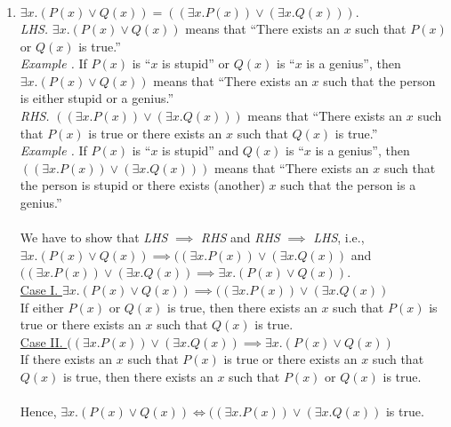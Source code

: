 \documentclass[11pt]{article}
\begin{document}
\begin{enumerate}
	\item $\exists x. (P(x) \lor Q(x)) = ((\exists x.P(x)) \lor (\exists x.Q(x))).$
	      \\
	      \emph{LHS. } $\exists x. (P(x) \lor Q(x))$ means that ``There exists an $x$ such that $P(x)$ or $Q(x)$ is true.'' \\ \emph{Example .} If $P(x)$ is ``$x$ is stupid'' or $Q(x)$ is ``$x$ is a genius'', then $\exists x. (P(x) \lor Q(x))$ means that ``There exists an $x$ such that the person is either stupid or a genius.''\bigskip
	      \\
	      \noindent \emph{RHS. } $((\exists x. P(x)) \lor (\exists x. Q(x)))$ means that ``There exists an $x$ such that $P(x)$ is true or there exists an $x$ such that $Q(x)$ is true.''\\ \emph{Example .} If $P(x)$ is ``$x$ is stupid'' and $Q(x)$ is ``$x$ is a genius'', then $((\exists x. P(x)) \lor (\exists x. Q(x)))$ means that ``There exists an $x$ such that the person is stupid or there exists (another) $x$ such that the person is a genius.''\\
	      \\
	      We have to show that \emph{LHS} $\implies$ \emph{RHS} and \emph{RHS} $\implies$ \emph{LHS}, i.e., $\exists x. (P(x) \lor Q(x)) \implies ((\exists x.P(x)) \lor (\exists x.Q(x))$ and $((\exists x.P(x)) \lor (\exists x.Q(x)) \implies \exists x. (P(x) \lor Q(x))$.\\
	      \underline{Case I. } $\exists x. (P(x) \lor Q(x)) \implies ((\exists x.P(x)) \lor (\exists x.Q(x))$\\
	      If either $P(x)$ or $Q(x)$ is true, then there exists an $x$ such that $P(x)$ is true or there exists an $x$ such that $Q(x)$ is true.\\
	      \underline{Case II. } $((\exists x.P(x)) \lor (\exists x.Q(x)) \implies \exists x. (P(x) \lor Q(x))$\\
	      If there exists an $x$ such that $P(x)$ is true or there exists an $x$ such that $Q(x)$ is true, then there exists an $x$ such that $P(x)$ or $Q(x)$ is true.\\
	      \\
	      Hence, $\exists x. (P(x) \lor Q(x)) \iff ((\exists x.P(x)) \lor (\exists x.Q(x))$ is true.\\




\end{enumerate}
\end{document}
